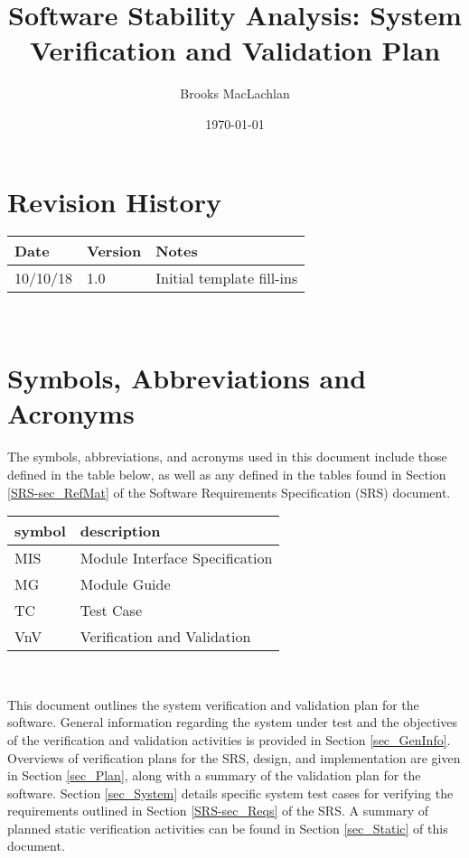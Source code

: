 \documentclass[12pt, titlepage]{article}
\begin{document}
\title{Software Stability Analysis: System Verification and Validation Plan} 
\author{Brooks MacLachlan}
\date{\today}
	
\maketitle


\section{Revision History}

\begin{tabularx}{\textwidth}{p{3cm}p{2cm}X}
\toprule {\bf Date} & {\bf Version} & {\bf Notes}\\
\midrule
10/10/18 & 1.0 & Initial template fill-ins\\
\bottomrule
\end{tabularx}

~\newpage

\section{Symbols, Abbreviations and Acronyms}
The symbols, abbreviations, and acronyms used in this document include those 
defined in the table below, as well as any defined in the tables found in 
Section \ref{SRS-sec_RefMat} of the Software Requirements Specification (SRS) 
document.
\newline

\renewcommand{\arraystretch}{1.2}
\begin{tabular}{l l} 
  \toprule		
  \textbf{symbol} & \textbf{description}\\
  \midrule 
  MIS & Module Interface Specification\\
  MG & Module Guide\\
  TC & Test Case\\
  VnV & Verification and Validation\\
  \bottomrule
\end{tabular}\\

\newpage

\tableofcontents

\listoftables

\listoffigures

\newpage


\noindent This document outlines the system verification and validation plan 
for the software. General information regarding the system under test and the 
objectives of the verification and validation activities is provided in Section 
\ref{sec_GenInfo}. Overviews of verification plans for the SRS, design, and 
implementation are given in Section \ref{sec_Plan}, along with a summary of the 
validation plan for the software. Section \ref{sec_System} details specific  
system test cases for verifying the requirements outlined in Section 
\ref{SRS-sec_Reqs} of the SRS. A summary of planned static verification 
activities can be found in Section \ref{sec_Static} of this document.
\end{document}
